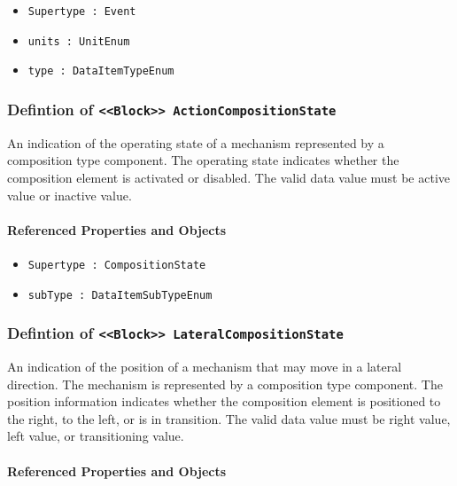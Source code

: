 \begin{itemize}
\item \texttt{Supertype : Event}

\item \texttt{units : UnitEnum}

\item \texttt{type : DataItemTypeEnum}

\end{itemize}
\FloatBarrier
\subsubsection{Defintion of \texttt{<<Block>> ActionCompositionState}}
  \label{type:ActionCompositionState}

\FloatBarrier

An indication of the operating state of a mechanism represented by a composition type component.
 The operating state indicates whether the composition element is activated or disabled. 
 The valid data value must be active value or inactive value.

\FloatBarrier
\paragraph{Referenced Properties and Objects}

\begin{itemize}
\item \texttt{Supertype : CompositionState}

\item \texttt{subType : DataItemSubTypeEnum}

\end{itemize}
\FloatBarrier
\subsubsection{Defintion of \texttt{<<Block>> LateralCompositionState}}
  \label{type:LateralCompositionState}

\FloatBarrier

An indication of the position of a mechanism that may move in a lateral direction.   The mechanism is represented by a composition type component. 
 The position information indicates whether the composition element is positioned to the right, to the left, or is in transition.  
 The valid data value must be right value, left value, or transitioning value.

\FloatBarrier
\paragraph{Referenced Properties and Objects}

